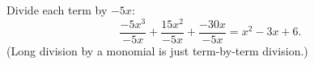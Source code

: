 Divide each term by $-5x$:
\[\dfrac{-5x^3}{-5x}+\dfrac{15x^2}{-5x}+\dfrac{-30x}{-5x}=\boxed{x^2-3x+6}.\]
(Long division by a monomial is just term-by-term division.)

